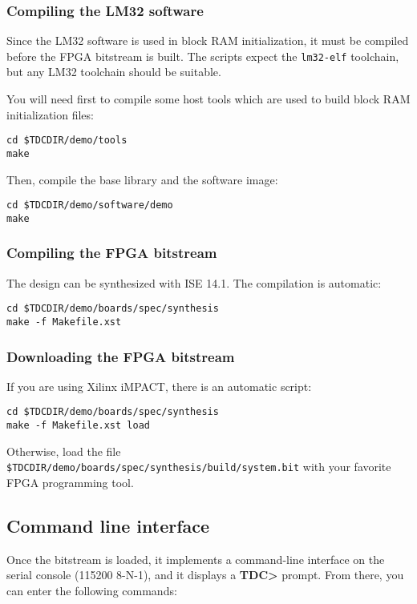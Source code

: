 \documentclass[a4paper,11pt]{article}
\begin{document}
\subsubsection{Compiling the LM32 software}
Since the LM32 software is used in block RAM initialization, it must be compiled before the FPGA bitstream is built. The scripts expect the \verb!lm32-elf! toolchain, but any LM32 toolchain should be suitable.

You will need first to compile some host tools which are used to build block RAM initialization files:
\begin{verbatim}
cd $TDCDIR/demo/tools
make
\end{verbatim}

Then, compile the base library and the software image:
\begin{verbatim}
cd $TDCDIR/demo/software/demo
make
\end{verbatim}

\subsubsection{Compiling the FPGA bitstream}
The design can be synthesized with ISE 14.1. The compilation is automatic:
\begin{verbatim}
cd $TDCDIR/demo/boards/spec/synthesis
make -f Makefile.xst
\end{verbatim}

\subsubsection{Downloading the FPGA bitstream}
If you are using Xilinx iMPACT, there is an automatic script:
\begin{verbatim}
cd $TDCDIR/demo/boards/spec/synthesis
make -f Makefile.xst load
\end{verbatim}

Otherwise, load the file \verb!$TDCDIR/demo/boards/spec/synthesis/build/system.bit! with your favorite FPGA programming tool.

\subsection{Command line interface}
Once the bitstream is loaded, it implements a command-line interface on the serial console (115200 8-N-1), and it displays a \textbf{TDC>} prompt. From there, you can enter the following commands:
\end{document}
